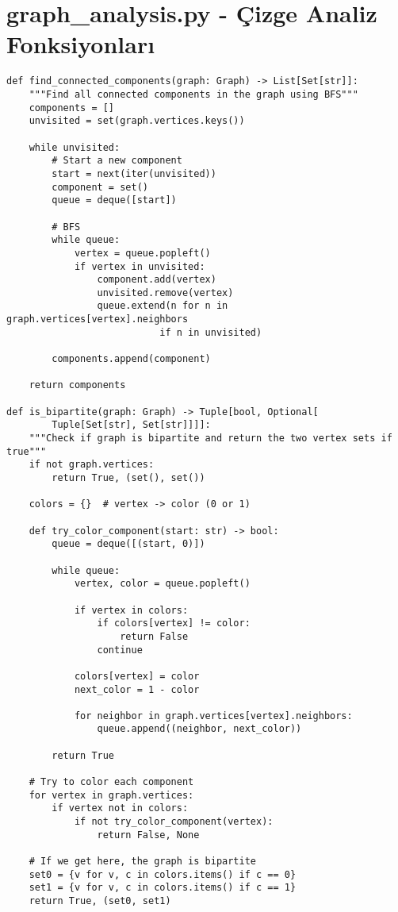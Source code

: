 \documentclass[12pt]{article}
\begin{document}
\section{graph\_analysis.py - Çizge Analiz Fonksiyonları}
\begin{lstlisting}
def find_connected_components(graph: Graph) -> List[Set[str]]:
    """Find all connected components in the graph using BFS"""
    components = []
    unvisited = set(graph.vertices.keys())
    
    while unvisited:
        # Start a new component
        start = next(iter(unvisited))
        component = set()
        queue = deque([start])
        
        # BFS
        while queue:
            vertex = queue.popleft()
            if vertex in unvisited:
                component.add(vertex)
                unvisited.remove(vertex)
                queue.extend(n for n in graph.vertices[vertex].neighbors 
                           if n in unvisited)
        
        components.append(component)
    
    return components

def is_bipartite(graph: Graph) -> Tuple[bool, Optional[
        Tuple[Set[str], Set[str]]]]:
    """Check if graph is bipartite and return the two vertex sets if true"""
    if not graph.vertices:
        return True, (set(), set())
    
    colors = {}  # vertex -> color (0 or 1)
    
    def try_color_component(start: str) -> bool:
        queue = deque([(start, 0)])
        
        while queue:
            vertex, color = queue.popleft()
            
            if vertex in colors:
                if colors[vertex] != color:
                    return False
                continue
                
            colors[vertex] = color
            next_color = 1 - color
            
            for neighbor in graph.vertices[vertex].neighbors:
                queue.append((neighbor, next_color))
        
        return True
    
    # Try to color each component
    for vertex in graph.vertices:
        if vertex not in colors:
            if not try_color_component(vertex):
                return False, None
    
    # If we get here, the graph is bipartite
    set0 = {v for v, c in colors.items() if c == 0}
    set1 = {v for v, c in colors.items() if c == 1}
    return True, (set0, set1)
\end{lstlisting}
\end{document}
